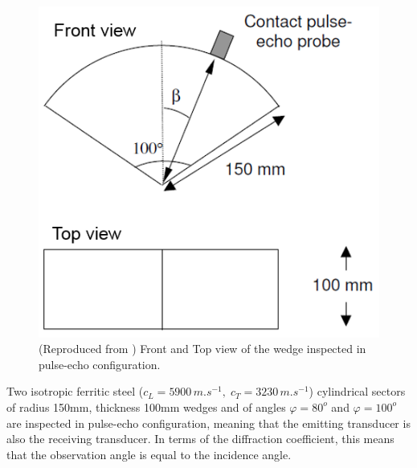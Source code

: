 \begin{figure}[h!]
\centering
\includegraphics[scale=0.8]{images/chapter3/wedge_schema.png}
\caption{(Reproduced from \cite{ChapmanBurch}) Front and Top view of the wedge inspected in pulse-echo configuration.}
\label{C3:wedge_schema}
\end{figure}

Two isotropic ferritic steel ($c_L=5900\,m.s^{-1}, \; c_T=3230\,m.s^{-1}$) cylindrical sectors of radius 150mm, thickness 100mm wedges and of angles $\varphi=80^o$ and $\varphi=100^o$ are inspected in pulse-echo configuration, meaning that the emitting transducer is also the receiving transducer. In terms of the diffraction coefficient, this means that the observation angle is equal to the incidence angle.

